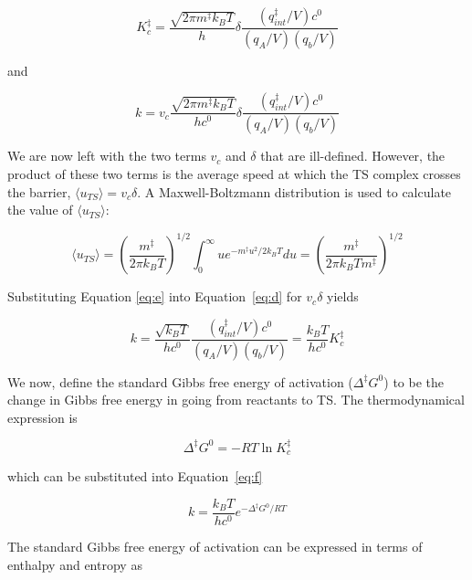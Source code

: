 \begin{equation}
  K_c^{\ddagger} =  \frac{\sqrt{2\pi m^\ddagger k_B T}}{h}\delta\frac{(q_{int}^\ddagger/V)c^0}{(q_A/V)(q_b/V)}
\end{equation}

\noindent and

\begin{equation}
 k = v_c \frac{\sqrt{2\pi m^\ddagger
     k_B T}}{hc^0}\delta\frac{(q_{int}^\ddagger/V)c^0}{(q_A/V)(q_b/V)}
\label{eq:d}
\end{equation}

We are now left with the two terms $v_c$ and $\delta$ that are ill-defined.
However, the product of these two terms is the average speed at which the TS
complex crosses the barrier, $\langle u_{TS} \rangle = v_c\delta$. A
Maxwell-Boltzmann distribution is used to calculate the value of $\langle
u_{TS} \rangle$:

\begin{equation}
  \langle u_{TS} \rangle = \left( \frac{m^\ddagger}{2\pi k_B T} \right)^{1/2}
  \int_0^\infty u e^{-m^\ddagger u^2/2k_B T}du = \left( \frac{m^\ddagger}{2\pi
      k_B T m^\ddagger} \right)^{1/2}
\label{eq:e}
\end{equation}

\noindent Substituting Equation \ref{eq:e} into Equation~\ref{eq:d} for
$v_c\delta$ yields

\begin{equation}
  k =
  \frac{\sqrt{k_B T}}{hc^0}\frac{(q_{int}^\ddagger/V)c^0}{(q_A/V)(q_b/V)} = \frac{k_B T}{hc^0}K_c^\ddagger
\label{eq:f}
\end{equation}

We now, define the standard Gibbs free energy of activation ($\Delta ^\ddagger
G^0$) to be the change in Gibbs free energy in going from reactants to TS.\@
The thermodynamical expression is

\begin{equation}
  \Delta ^\ddagger G^0 = -RT \ln K_c^\ddagger
\end{equation}

\noindent which can be substituted into Equation~\ref{eq:f}

\begin{equation}
  k = \frac{k_B T}{hc^0} e^{-\Delta^\ddagger G^0/RT}
\label{eq:g}
\end{equation}

The standard Gibbs free energy of activation can be expressed in terms of
enthalpy and entropy as

